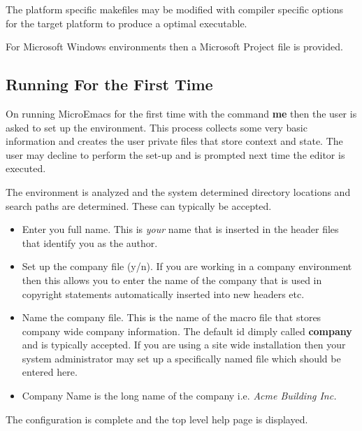 \documentclass[11pt,a4paper,pdftex]{article}
\begin{document}
    The platform specific makefiles may be modified with compiler specific
    options for the target platform to produce a optimal executable.

    For Microsoft Windows environments then a Microsoft Project file is
    provided.

\subsection{Running For the First Time}

    On running MicroEmacs for the first time with the command \textbf{me} then
    the user is asked to set up the environment. This process collects some
    very basic information and creates the user private files that store
    context and state. The user may decline to perform the set-up and is
    prompted next time the editor is executed.

    The environment is analyzed and the system determined directory locations
    and search paths are determined. These can typically be accepted.

    \begin{itemize}

        \item Enter you full name. This is \textit{your} name that is inserted
        in the header files that identify you as the author.

        \item Set up the company file (y/n). If you are working in a company
        environment then this allows you to enter the name of the company that
        is used in copyright statements automatically inserted into new
        headers etc.

        \item Name the company file. This is the name of the macro file
        that stores company wide company information. The default id dimply
        called \textbf{company} and is typically accepted. If you are using a
        site wide installation then your system administrator may set up a
        specifically named file which should be entered here.

        \item Company Name is the long name of the company i.e. \textit{Acme
        Building Inc.}

    \end{itemize}

    The configuration is complete and the top level help page is displayed.
\end{document}
